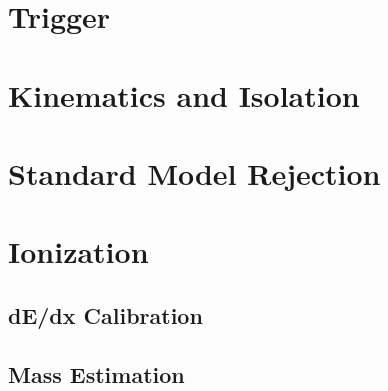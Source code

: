 
\section{Trigger}


\section{Kinematics and Isolation}
\label{sec:track_requirements}


\section{Standard Model Rejection}
\label{sec:sm_rejection}


\section{Ionization}

\subsection{dE/dx Calibration}

\subsection{Mass Estimation}
\label{sec:mass_requirement}
